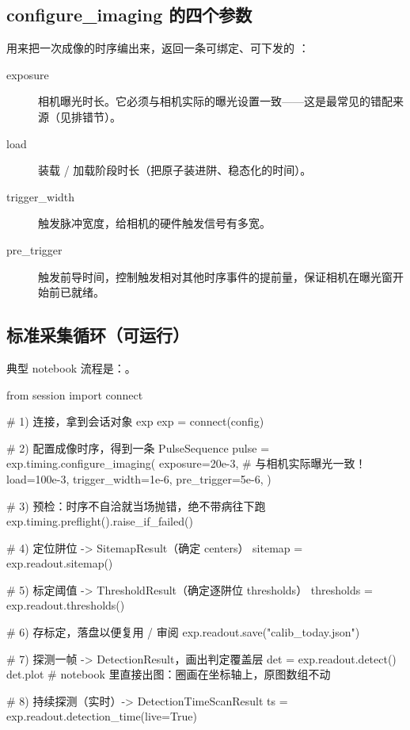 \documentclass[11pt,oneside,openany]{book}
\begin{document}
\subsection{configure\_imaging 的四个参数}

 用来把一次成像的时序编出来，返回一条可绑定、可下发的 ：

\begin{description}
\item[exposure] 相机曝光时长。它必须与相机实际的曝光设置一致——这是最常见的错配来源（见排错节）。
\item[load] 装载 / 加载阶段时长（把原子装进阱、稳态化的时间）。
\item[trigger\_width] 触发脉冲宽度，给相机的硬件触发信号有多宽。
\item[pre\_trigger] 触发前导时间，控制触发相对其他时序事件的提前量，保证相机在曝光窗开始前已就绪。
\end{description}

\subsection{标准采集循环（可运行）}

典型 notebook 流程是：。

\begin{codeblock}[Python]
from session import connect

# 1) 连接，拿到会话对象 exp
exp = connect(config)

# 2) 配置成像时序，得到一条 PulseSequence
pulse = exp.timing.configure_imaging(
    exposure=20e-3,      # 与相机实际曝光一致！
    load=100e-3,
    trigger_width=1e-6,
    pre_trigger=5e-6,
)

# 3) 预检：时序不自洽就当场抛错，绝不带病往下跑
exp.timing.preflight().raise_if_failed()

# 4) 定位阱位 -> SitemapResult（确定 centers）
sitemap = exp.readout.sitemap()

# 5) 标定阈值 -> ThresholdResult（确定逐阱位 thresholds）
thresholds = exp.readout.thresholds()

# 6) 存标定，落盘以便复用 / 审阅
exp.readout.save("calib_today.json")

# 7) 探测一帧 -> DetectionResult，画出判定覆盖层
det = exp.readout.detect()
det.plot   # notebook 里直接出图：圈画在坐标轴上，原图数组不动

# 8) 持续探测（实时）-> DetectionTimeScanResult
ts = exp.readout.detection_time(live=True)
\end{codeblock}
\end{document}
